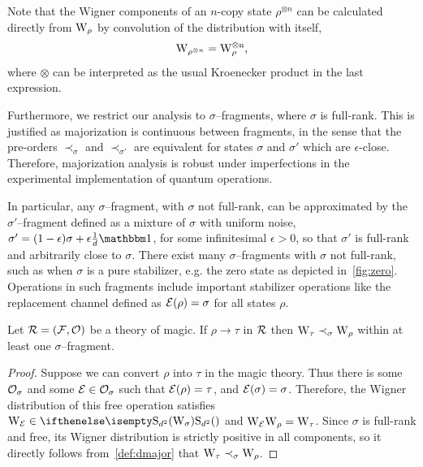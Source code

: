 \documentclass[pra,
aps,
twocolumn,
superscriptaddress,
groupedaddress,
nofootinbib,
reprint
]{revtex4-1}
\begin{document}
Note that the Wigner components of an $n$-copy state $\rho^{\otimes n}$ can be calculated directly from $\W{\rho}$ by convolution of the distribution with itself,
\begin{equation}
	\W{\rho^{\otimes n}} = \rm{W}_{\rho}^{\otimes n},
\end{equation}
where $\otimes$ can be interpreted as the usual Kroenecker product in the last expression.

Furthermore, we restrict our analysis to $\sigma$--fragments, where $\sigma$ is full-rank.
This is justified as majorization is continuous between fragments, in the sense that the pre-orders $\prec_\sigma$ and $\prec_{\sigma'}$ are equivalent for states $\sigma$ and $\sigma'$ which are $\epsilon$-close. 
Therefore, majorization analysis is robust under imperfections in the experimental implementation of quantum operations.

In particular, any $\sigma$--fragment, with $\sigma$ not full-rank, can be approximated by the $\sigma'$--fragment defined as a mixture of $\sigma$ with uniform noise, $\sigma' = (1-\epsilon)\sigma + \epsilon\frac{1}{d}\id$, for some infinitesimal $\epsilon > 0$, so that $\sigma'$ is full-rank and arbitrarily close to $\sigma$.
There exist many $\sigma$--fragments with $\sigma$ not full-rank, such as when $\sigma$ is a pure stabilizer, e.g. the zero state as depicted in~\cref{fig:zero}. 
Operations in such fragments include important stabilizer operations like the replacement channel defined as $\mathcal{E}(\rho) = \sigma$ for all states $\rho$.

\begin{theorem}\label{thm:sigmamajor}
    Let $\mathcal{R} = (\mathcal{F}, \mathcal{O})$ be a theory of magic. If $\rho \longrightarrow \tau$  in $\mathcal{R}$ then  $\W{\tau} \prec_\sigma \W{\rho}$ within at least one $\sigma$--fragment.
\end{theorem}
\begin{proof}
Suppose we can convert $\rho$ into $\tau$ in the magic theory. 
Thus there is some $\mathcal{O}_\sigma$ and some $\mathcal{E} \in \mathcal{O}_\sigma$ such that $\mathcal{E}(\rho) = \tau$, and $\mathcal{E}(\sigma)=\sigma$. 
Therefore, the Wigner distribution of this free operation satisfies $\W{\E} \in \stochw$ and $\W{\E}\W{\rho} = \W{\tau}$. 
Since $\sigma$ is full-rank and free, its Wigner distribution is strictly positive in all components, so it directly follows from~\cref{def:dmajor} that $\W{\tau} \prec_{\sigma} \W{\rho}$.

\end{proof}
\end{document}
